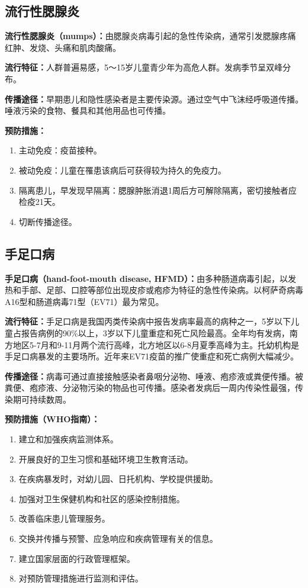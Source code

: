 \subsection{流行性腮腺炎}

\begin{keybox}
\textbf{流行性腮腺炎（mumps）：}由腮腺炎病毒引起的急性传染病，通常引发腮腺疼痛红肿、发烧、头痛和肌肉酸痛。

\textbf{流行特征：}人群普遍易感，5～15岁儿童青少年为高危人群。发病季节呈双峰分布。

\textbf{传播途径：}早期患儿和隐性感染者是主要传染源。通过空气中飞沫经呼吸道传播。唾液污染的食物、餐具和其他用品也可传播。

\textbf{预防措施：}
\begin{enumerate}[leftmargin=*]
    \item 主动免疫：疫苗接种。
    \item 被动免疫：儿童在罹患该病后可获得较为持久的免疫力。
    \item 隔离患儿，早发现早隔离：腮腺肿胀消退1周后方可解除隔离，密切接触者应检疫21天。
    \item 切断传播途径。
\end{enumerate}
\end{keybox}

\subsection{手足口病}

\begin{keybox}
\textbf{手足口病（hand-foot-mouth disease, HFMD）：}由多种肠道病毒引起，以发热和手部、足部、口腔等部位出现皮疹或疱疹为特征的急性传染病。以柯萨奇病毒A16型和肠道病毒71型（EV71）最为常见。

\textbf{流行特征：}手足口病是我国丙类传染病中报告发病率最高的病种之一，5岁以下儿童占报告病例的90\%以上，3岁以下儿童重症和死亡风险最高。全年均有发病，南方地区5-7月和9-11月两个流行高峰，北方地区以6-8月夏季高峰为主。托幼机构是手足口病暴发的主要场所。近年来EV71疫苗的推广使重症和死亡病例大幅减少。

\textbf{传播途径：}病毒可通过直接接触感染者鼻咽分泌物、唾液、疱疹液或粪便传播。被粪便、疱疹液、分泌物污染的物品也可传播。感染者发病后一周内传染性最强，传染期可持续数周。

\textbf{预防措施（WHO指南）：}
\begin{enumerate}[leftmargin=*]
    \item 建立和加强疾病监测体系。
    \item 开展良好的卫生习惯和基础环境卫生教育活动。
    \item 在疾病暴发时，对幼儿园、日托机构、学校提供援助。
    \item 加强对卫生保健机构和社区的感染控制措施。
    \item 改善临床患儿管理服务。
    \item 交换并传播与预警、应急响应和疾病管理有关的信息。
    \item 建立国家层面的行政管理框架。
    \item 对预防管理措施进行监测和评估。
\end{enumerate}
\end{keybox}

